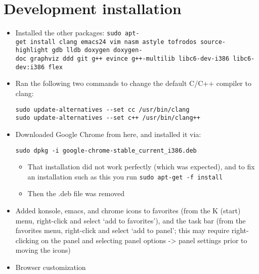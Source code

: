 \section{Development installation}

\begin{itemize}
\item
  Installed the other packages:
  \texttt{sudo\ apt-get\ install\ clang\ emacs24\ vim\ nasm\ astyle\ tofrodos\ source-highlight\ gdb\ lldb\ doxygen\ doxygen-doc\ graphviz\ ddd\ git\ g++\ evince\ g++-multilib\ libc6-dev-i386\ libc6-dev:i386\ flex}

  
\item
  Ran the following two commands to change the default C/C++ compiler to
  clang:

\begin{verbatim}
sudo update-alternatives --set cc /usr/bin/clang
sudo update-alternatives --set c++ /usr/bin/clang++
\end{verbatim}
\item
  Downloaded Google Chrome from
  here,
  and installed it via:

  
\begin{verbatim}
sudo dpkg -i google-chrome-stable_current_i386.deb
\end{verbatim}

  \begin{itemize}
  \tightlist
  \item
    That installation did not work perfectly (which was expected), and
    to fix an installation such as this you run
    \texttt{sudo\ apt-get\ -f\ install}
  \item
    Then the .deb file was removed
  \end{itemize}
\item
  Added konsole, emacs, and chrome icons to favorites (from the K
  (start) menu, right-click and select `add to favorites'), and the task
  bar (from the favorites menu, right-click and select `add to panel';
  this may require right-clicking on the panel and selecting panel
  options -\textgreater{} panel settings prior to moving the icons)
\item
  Browser customization


\end{itemize}
